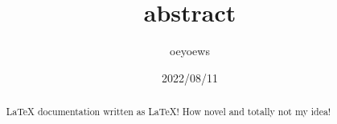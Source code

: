 \documentclass[UTF8]{ctexart}
\title{abstract}
\author{oeyoews}
\date{2022/08/11}
\begin{document}
\maketitle


\begin{abstract}
 \LaTeX{} documentation written as \LaTeX! How novel and totally not
 my idea!
\end{abstract}
\end{document}
